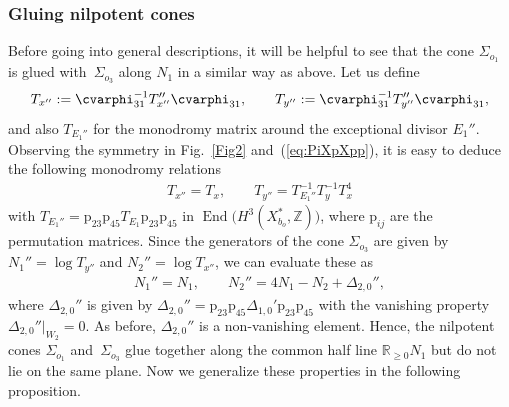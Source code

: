 \documentclass[10pt,a4paper]{amsart}
\numberwithin{equation}{section}
\begin{document}
\subsubsection{Gluing nilpotent cones} Before going into general descriptions, it will be helpful to see that the cone $\Sigma_{o_{1}}$ is glued with~$\Sigma_{o_{3}}$ along $N_{1}$ in a similar way as above. Let
us define
\begin{gather*}
T_{x''}:=\cvarphi_{31}^{-1}T_{x''}''\cvarphi_{31},\qquad T_{y''}:=\cvarphi_{31}^{-1}T_{y''}''\cvarphi_{31},
\end{gather*}
and also $T_{E_{1}''}$ for the monodromy matrix around the exceptional divisor $E_{1}''$. Observing the symmetry in Fig.~\ref{Fig2} and~(\ref{eq:PiXpXpp}), it is easy to deduce the following monodromy relations
\begin{gather}
\boxed{T_{x''}=T_{x},\qquad T_{y''}=T_{E_{1}''}^{-1}T_{y}^{-1}T_{x}^{4}}\label{eq:T-relation2}
\end{gather}
with $T_{E_{1}''}=\mathrm{p}_{23}\mathrm{p}_{45}T_{E_{1}}\mathrm{p}_{23}\mathrm{p}_{45}$ in $\operatorname{End}\big(H^{3}(X_{b_{o}}^{*},\mathbb{Z})\big)$, where $\mathrm{p}_{ij}$ are the permutation matrices. Since the generators of the cone $\Sigma_{o_{3}}$ are given by $N_{1}''=\log T_{y''}$ and $N_{2}''=\log T_{x''}$, we can evaluate these as
\begin{gather}
N_{1}''=N_{1},\qquad N_{2}''=4N_{1}-N_{2}+\Delta_{2,0}'',\label{eq:Npp-and-N}
\end{gather}
where $\Delta_{2,0}''$ is given by $\Delta_{2,0}''=\mathrm{p}_{23}\mathrm{p}_{45}\Delta_{1,0}'\mathrm{p}_{23}\mathrm{p}_{45}$ with the vanishing property $\Delta_{2,0}''\vert_{W_{2}}=0$. As before, $\Delta_{2,0}''$ is a non-vanishing element. Hence, the nilpotent cones $\Sigma_{o_{1}}$ and~$\Sigma_{o_{3}}$ glue together along the common half line $\mathbb{R}_{\geq0}N_{1}$ but do not lie on the same plane. Now we generalize these properties in the following proposition.
\end{document}
